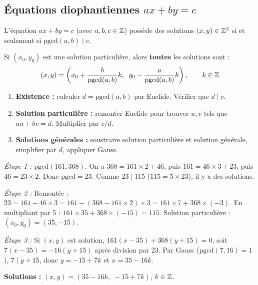 \subsection{Équations diophantiennes $ax + by = c$}

\begin{propbox}
L'équation $ax + by = c$ (avec $a, b, c \in \mathbb{Z}$) possède des solutions $(x, y) \in \mathbb{Z}^2$ si et seulement si $\text{pgcd}(a, b) \mid c$.

Si $(x_0, y_0)$ est une solution particulière, alors \textbf{toutes} les solutions sont :
\[
  (x, y) = \left(x_0 + \frac{b}{\text{pgcd}(a,b)} k,\;\; y_0 - \frac{a}{\text{pgcd}(a,b)} k\right), \qquad k \in \mathbb{Z}
\]
\end{propbox}

\begin{methodbox}
\begin{enumerate}[leftmargin=1.5cm]
  \item \textbf{Existence :} calculer $d = \text{pgcd}(a,b)$ par Euclide. Vérifier que $d \mid c$.
  \item \textbf{Solution particulière :} remonter Euclide pour trouver $u, v$ tels que $au + bv = d$. Multiplier par $c/d$.
  \item \textbf{Solutions générales :} soustraire solution particulière et solution générale, simplifier par $d$, appliquer Gauss.
\end{enumerate}
\end{methodbox}

\begin{exbox}[Résolution de $161x + 368y = 115$]
\textit{Étape 1 :} $\text{pgcd}(161, 368)$. On a $368 = 161 \times 2 + 46$, puis $161 = 46 \times 3 + 23$, puis $46 = 23 \times 2$. Donc $\text{pgcd} = 23$. Comme $23 \mid 115$ ($115 = 5 \times 23$), il y a des solutions.

\textit{Étape 2 :} Remontée : $23 = 161 - 46 \times 3 = 161 - (368 - 161 \times 2) \times 3 = 161 \times 7 + 368 \times (-3)$. En multipliant par 5 : $161 \times 35 + 368 \times (-15) = 115$. Solution particulière : $(x_0, y_0) = (35, -15)$.

\textit{Étape 3 :} Si $(x, y)$ est solution, $161(x - 35) + 368(y + 15) = 0$, soit $7(x - 35) = -16(y + 15)$ après division par 23. Par Gauss ($\text{pgcd}(7, 16) = 1$), $7 \mid y + 15$, donc $y = -15 + 7k$ et $x = 35 - 16k$.

\textbf{Solutions :} $(x, y) = (35 - 16k,\; -15 + 7k)$, $k \in \mathbb{Z}$.
\end{exbox}


